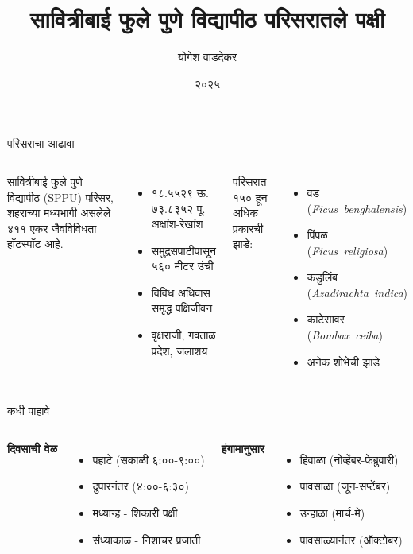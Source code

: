 \documentclass[aspectratio=169]{beamer}
\title{सावित्रीबाई फुले पुणे विद्यापीठ परिसरातले पक्षी}
\author{योगेश वाडदेकर}
\institute{सावित्रीबाई फुले पुणे विद्यापीठ}
\date{२०२५}
\newcommand{\latinphrase}[1]{{\latintext #1}}
\newcommand{\sciname}[1]{\mbox{\latintext\textit{#1}}}
\begin{document}
\begin{frame}
    \maketitle
\end{frame}

\begin{frame}{परिसराचा आढावा}
    \begin{columns}[T]
        सावित्रीबाई फुले पुणे विद्यापीठ ({\latinphrase SPPU}) परिसर, शहराच्या मध्यभागी असलेले ४११ एकर जैवविविधता हॉटस्पॉट आहे.
        \begin{itemize}
            \item १८.५५२९ ऊ. ७३.८३५२ पू. अक्षांश-रेखांश
            \item समुद्रसपाटीपासून ५६० मीटर उंची
            \item विविध अधिवास समृद्ध पक्षिजीवन
            \item वृक्षराजी, गवताळ प्रदेश, जलाशय
        \end{itemize}
        परिसरात १५० हून अधिक प्रकारची झाडे:
        \begin{itemize}
            \item वड (\sciname{Ficus benghalensis})
            \item पिंपळ (\sciname{Ficus religiosa})
            \item कडुलिंब (\sciname{Azadirachta indica})
            \item काटेसावर (\sciname{Bombax ceiba})
            \item अनेक शोभेची झाडे
        \end{itemize}
    \end{columns}
\end{frame}

\begin{frame}{कधी पाहावे}
    \begin{columns}[T]
        \textbf{दिवसाची वेळ}
        \begin{itemize}
            \item पहाटे (सकाळी ६:००-९:००)
            \item दुपारनंतर (४:००-६:३०)
            \item मध्यान्ह - शिकारी पक्षी
            \item संध्याकाळ - निशाचर प्रजाती
        \end{itemize}
        \textbf{हंगामानुसार}
        \begin{itemize}
            \item हिवाळा (नोव्हेंबर-फेब्रुवारी)
            \item पावसाळा (जून-सप्टेंबर)
            \item उन्हाळा (मार्च-मे)
            \item पावसाळ्यानंतर (ऑक्टोबर)
        \end{itemize}
    \end{columns}
\end{frame}
\end{document}
